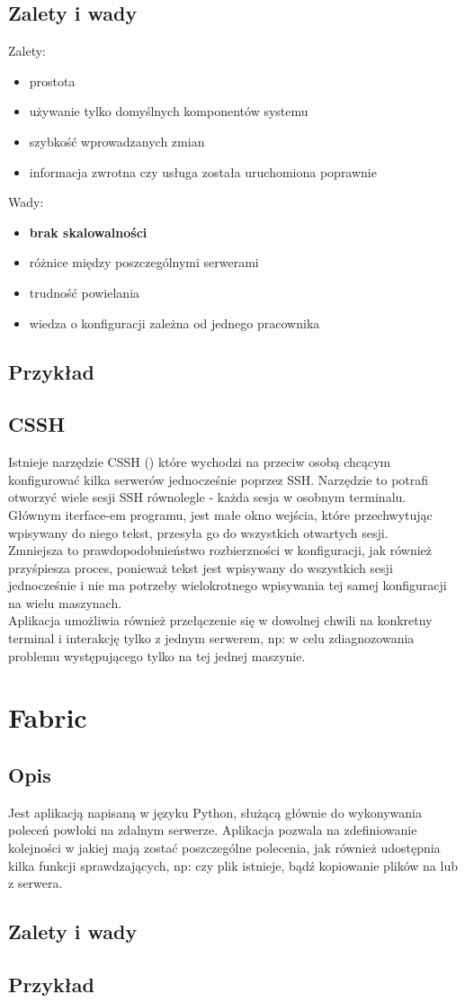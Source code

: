 \subsection{Zalety i wady}
Zalety:
\begin{itemize}
\item prostota
\item używanie tylko domyślnych komponentów systemu
\item szybkość wprowadzanych zmian
\item informacja zwrotna czy usługa została uruchomiona poprawnie
\end{itemize}
Wady:
\begin{itemize}
\item \textbf{brak skalowalności}
\item różnice między poszczególnymi serwerami
\item trudność powielania
\item wiedza o konfiguracji zależna od jednego pracownika
\end{itemize}
\subsection{Przykład}

\subsection{CSSH}
Istnieje narzędzie CSSH () które wychodzi na przeciw osobą chcącym konfigurować kilka serwerów jednocześnie poprzez SSH.
Narzędzie to potrafi otworzyć wiele sesji SSH równolegle - każda sesja w osobnym terminalu.
Głównym iterface-em programu, jest małe okno wejścia, które przechwytując wpisywany do niego tekst, przesyła go do wszystkich otwartych sesji.\\
Zmniejsza to prawdopodobnieństwo rozbierzności w konfiguracji, jak również przyśpiesza proces, ponieważ tekst jest wpisywany do wszystkich sesji jednocześnie i nie ma potrzeby wielokrotnego wpisywania tej samej konfiguracji na wielu maszynach.\\
Aplikacja umożliwia również przełączenie się w dowolnej chwili na konkretny terminal i interakcję tylko z jednym serwerem, np: w celu zdiagnozowania problemu występującego tylko na tej jednej maszynie.
\section{Fabric}
\subsection{Opis}
Jest aplikacją napisaną w języku Python, służącą głównie do wykonywania poleceń powłoki na zdalnym serwerze. Aplikacja pozwala na zdefiniowanie kolejności w jakiej mają zostać poszczególne polecenia, jak również udostępnia kilka funkcji sprawdzających, np: czy plik istnieje, bądź kopiowanie plików na lub z serwera.\\

\subsection{Zalety i wady}
\subsection{Przykład}
